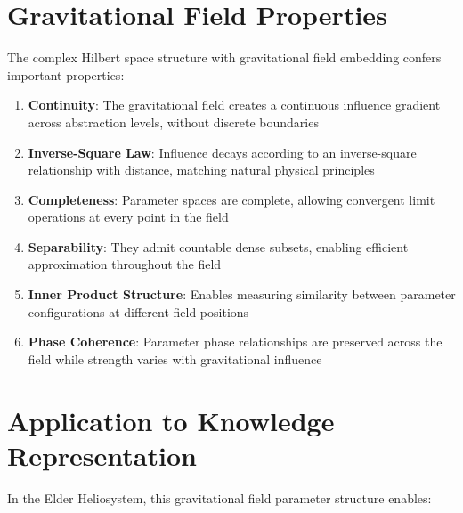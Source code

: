 \section{Gravitational Field Properties}

The complex Hilbert space structure with gravitational field embedding confers important properties:

\begin{enumerate}
    \item \textbf{Continuity}: The gravitational field creates a continuous influence gradient across abstraction levels, without discrete boundaries
    
    \item \textbf{Inverse-Square Law}: Influence decays according to an inverse-square relationship with distance, matching natural physical principles
    
    \item \textbf{Completeness}: Parameter spaces are complete, allowing convergent limit operations at every point in the field
    
    \item \textbf{Separability}: They admit countable dense subsets, enabling efficient approximation throughout the field
    
    \item \textbf{Inner Product Structure}: Enables measuring similarity between parameter configurations at different field positions
    
    \item \textbf{Phase Coherence}: Parameter phase relationships are preserved across the field while strength varies with gravitational influence
\end{enumerate}

\section{Application to Knowledge Representation}

In the Elder Heliosystem, this gravitational field parameter structure enables:


